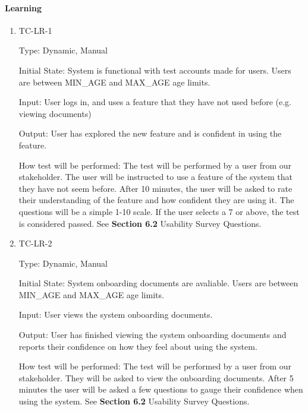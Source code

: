 \documentclass[12pt, titlepage]{article}
\begin{document}
\paragraph{Learning}
\begin{enumerate}
  \item{TC-LR-1\\}

    Type: Dynamic, Manual

    Initial State: System is functional with test accounts made for users. Users
    are between MIN\_AGE and MAX\_AGE age limits.

    Input: User logs in, and uses a feature that they have not used
    before (e.g. viewing documents)

    Output: User has explored the new feature and is confident in using the
    feature.

    How test will be performed: The test will be performed by a user from our
    stakeholder. The user will be instructed to use a feature of the system that
    they have not seem before. After 10 minutes, the user will be asked to rate
    their understanding of the feature and how confident they are using it. The
    questions will be a simple 1-10 scale. If the user selects a 7 or above, the
    test is considered passed. See \textbf{Section 6.2} Usability
    Survey Questions.

  \item{TC-LR-2\\}

    Type: Dynamic, Manual

    Initial State: System onboarding documents are avaliable. Users
    are between MIN\_AGE and MAX\_AGE age limits.

    Input: User views the system onboarding documents.

    Output: User has finished viewing the system onboarding documents and
    reports their confidence on how they feel about using the system.

    How test will be performed: The test will be performed by a user from our
    stakeholder. They will be asked to view the onboarding documents. After 5
    minutes the user will be asked a few questions to gauge their
    confidence when using the
    system. See \textbf{Section 6.2} Usability Survey Questions.

\end{enumerate}
\end{document}
